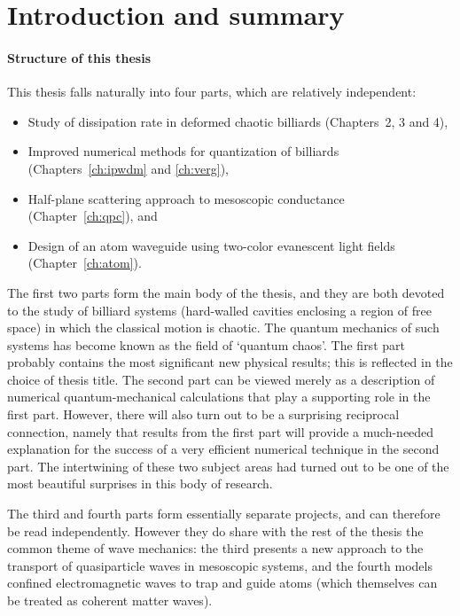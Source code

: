 \chapter{Introduction and summary}

\subsubsection{Structure of this thesis}


This thesis falls naturally into four parts, which are relatively
independent:
\begin{itemize}
\item Study of dissipation rate in deformed chaotic billiards (Chapters~2,
3 and 4),
\item Improved numerical methods for quantization of billiards
(Chapters~\ref{ch:ipwdm} and \ref{ch:verg}),
\item Half-plane scattering
approach to mesoscopic conductance
(Chapter~\ref{ch:qpc}), and
\item Design of an atom waveguide using two-color evanescent light fields
(Chapter~\ref{ch:atom}).
\end{itemize}

The first two parts form the main body of the thesis, and they are both
devoted to the study of billiard systems (hard-walled cavities
enclosing a region of free space)
in which the classical motion is chaotic.
The quantum mechanics of such systems has become known as the field of
`quantum chaos'.
The first part probably contains the most significant new physical results;
this is reflected in the choice of thesis title.
The second part can be viewed merely as a description of numerical
quantum-mechanical calculations that play a
supporting role in the first part.
However, there will also turn out to be a surprising reciprocal connection,
namely that results from the first part will provide a much-needed
explanation for the success of a very efficient numerical technique
in the second part.
The intertwining of these two subject areas had turned out to be one of the
most beautiful surprises in this body of research.

The third and fourth parts form essentially separate projects, and can
therefore be read independently.
However they do share with the rest of the thesis the common theme of
wave mechanics: the third presents a new approach to
the transport of quasiparticle waves in mesoscopic systems,
and the fourth models confined electromagnetic waves to trap and guide atoms
(which themselves can be treated as coherent matter waves).

